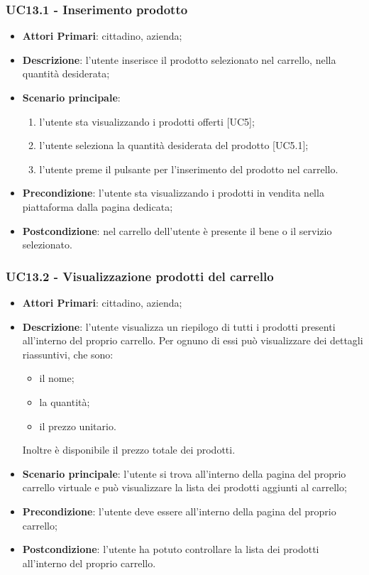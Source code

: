  \subsubsection{UC13.1 - Inserimento prodotto}
\begin{itemize}
	\item \textbf{Attori Primari}: cittadino, azienda;
	\item \textbf{Descrizione}: l'utente inserisce il prodotto selezionato nel carrello, nella quantità desiderata;
	\item \textbf{Scenario principale}:
	\begin{enumerate}[label=\alph*.]
		\item l'utente sta visualizzando i prodotti offerti [UC5];
		\item l'utente seleziona la quantità desiderata del prodotto [UC5.1];
		\item l'utente preme il pulsante per l'inserimento del prodotto nel carrello.
	\end{enumerate}
	\item \textbf{Precondizione}: l'utente sta visualizzando i prodotti in vendita nella piattaforma dalla pagina dedicata;
	\item \textbf{Postcondizione}: nel carrello dell'utente è presente il bene o il servizio selezionato.
\end{itemize}
\subsubsection{UC13.2 - Visualizzazione prodotti del carrello}
\begin{itemize}
	\item \textbf{Attori Primari}: cittadino, azienda;
	\item \textbf{Descrizione}: l'utente visualizza un riepilogo di tutti i prodotti presenti all'interno del proprio carrello. Per ognuno di essi può visualizzare dei dettagli riassuntivi, che sono:
	\begin{itemize}
		\item il nome;
		\item la quantità;
		\item il prezzo unitario.
	\end{itemize}
	Inoltre è disponibile il prezzo totale dei prodotti.

	\item \textbf{Scenario principale}: l'utente si trova all'interno della pagina del proprio carrello virtuale e può visualizzare la lista dei prodotti aggiunti al carrello;
	\item \textbf{Precondizione}: l'utente deve essere all'interno della pagina del proprio carrello;
	\item \textbf{Postcondizione}: l'utente ha potuto controllare la lista dei prodotti all'interno del proprio carrello.
\end{itemize}

